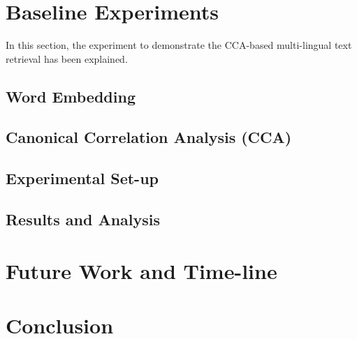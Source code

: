 \documentclass{article} %
\begin{document}
\section{Baseline Experiments}
\label{experiment}

In this section, the experiment to demonstrate the CCA-based multi-lingual text retrieval has been explained.
\subsection{Word Embedding}
\subsection{Canonical Correlation Analysis (CCA)}
\subsection{Experimental Set-up}
\subsection{Results and Analysis}




\section{Future Work and Time-line}





\section{Conclusion}



\end{document}
